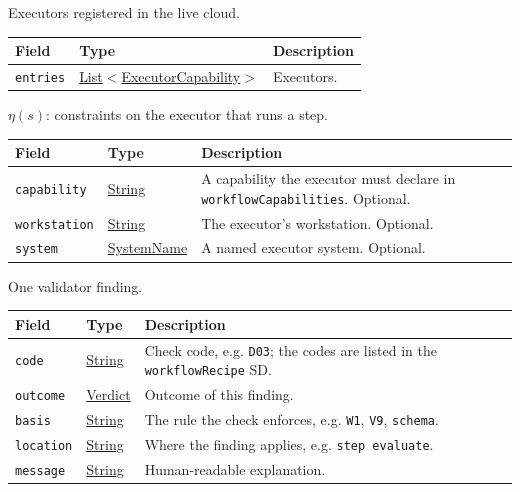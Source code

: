 \documentclass[a4paper]{arrowhead}
\newcommand{\mref}[1]{{\textcolor{ArrowheadPurple}{\hyperref[sec:model:#1]{#1}}}}
\newcommand{\pref}[1]{{\textcolor{ArrowheadGrey}{\hyperref[sec:model:primitives:#1]{#1}}}}
\begin{document}
Executors registered in the live cloud.

{\small
\begin{longtable}{|p{3.9cm}|p{4.4cm}|p{7.5cm}|}

\hline
\rowcolor{gray!33} Field & Type & Description \\ \hline
\endhead
\texttt{entries} & \pref{List}$<$\mref{ExecutorCapability}$>$ & Executors. \\ \hline
\end{longtable}
}

$\eta(s)$: constraints on the executor that runs a step.

{\small
\begin{longtable}{|p{3.9cm}|p{4.4cm}|p{7.5cm}|}

\hline
\rowcolor{gray!33} Field & Type & Description \\ \hline
\endhead
\texttt{capability} & \pref{String} & A capability the executor must declare in \texttt{workflowCapabilities}. Optional. \\ \hline
\texttt{workstation} & \pref{String} & The executor's workstation. Optional. \\ \hline
\texttt{system} & \pref{SystemName} & A named executor system. Optional. \\ \hline
\end{longtable}
}

One validator finding.

{\small
\begin{longtable}{|p{3.9cm}|p{4.4cm}|p{7.5cm}|}

\hline
\rowcolor{gray!33} Field & Type & Description \\ \hline
\endhead
\texttt{code} & \pref{String} & Check code, e.g. \texttt{D03}; the codes are listed in the \texttt{workflowRecipe} SD. \\ \hline
\texttt{outcome} & \mref{Verdict} & Outcome of this finding. \\ \hline
\texttt{basis} & \pref{String} & The rule the check enforces, e.g. \texttt{W1}, \texttt{V9}, \texttt{schema}. \\ \hline
\texttt{location} & \pref{String} & Where the finding applies, e.g. \texttt{step evaluate}. \\ \hline
\texttt{message} & \pref{String} & Human-readable explanation. \\ \hline
\end{longtable}
}
\end{document}
